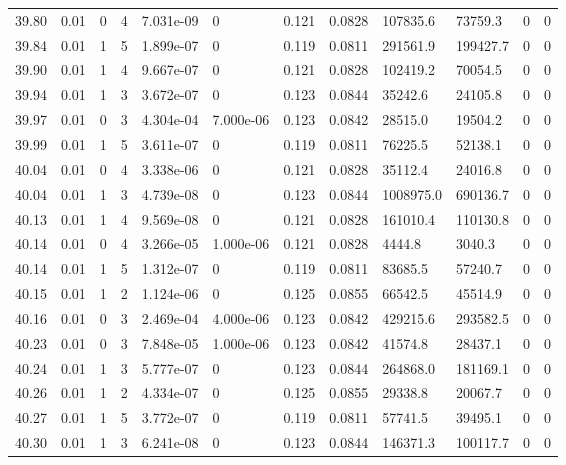 \documentclass[preview]{standalone}
\begin{document}
{{{{{{{{{{{\begin{tabular}{L{1.2cm}C{1.2cm} C{0.3cm}C{0.5cm} C{1.4cm}C{1.4cm} C{1.4cm}C{1.4cm} C{1.6cm}C{1.6cm} C{1.6cm}C{1.6cm}}
  39.80  &  0.01  & 0     &  4 &  7.031e-09  & 0  &  0.121&   0.0828& 107835.6 & 73759.3   &  0 & 0  \\ 
  39.84  &  0.01  & 1     &  5 &  1.899e-07  & 0  &  0.119&   0.0811& 291561.9 & 199427.7   &  0 & 0  \\ 
  39.90  &  0.01  & 1     &  4 &  9.667e-07  & 0  &  0.121&   0.0828& 102419.2 & 70054.5   &  0 & 0  \\ 
  39.94  &  0.01  & 1     &  3 &  3.672e-07  & 0  &  0.123&   0.0844& 35242.6 & 24105.8   &  0 & 0  \\ 
  39.97  &  0.01  & 0     &  3 &  4.304e-04  & 7.000e-06  &  0.123&   0.0842& 28515.0 & 19504.2   &  0 & 0  \\ 
  39.99  &  0.01  & 1     &  5 &  3.611e-07  & 0  &  0.119&   0.0811& 76225.5 & 52138.1   &  0 & 0  \\ 
  40.04  &  0.01  & 0     &  4 &  3.338e-06  & 0  &  0.121&   0.0828& 35112.4 & 24016.8   &  0 & 0  \\ 
  40.04  &  0.01  & 1     &  3 &  4.739e-08  & 0  &  0.123&   0.0844& 1008975.0 & 690136.7   &  0 & 0  \\ 
  40.13  &  0.01  & 1     &  4 &  9.569e-08  & 0  &  0.121&   0.0828& 161010.4 & 110130.8   &  0 & 0  \\ 
  40.14  &  0.01  & 0     &  4 &  3.266e-05  & 1.000e-06  &  0.121&   0.0828& 4444.8 & 3040.3   &  0 & 0  \\ 
  40.14  &  0.01  & 1     &  5 &  1.312e-07  & 0  &  0.119&   0.0811& 83685.5 & 57240.7   &  0 & 0  \\ 
  40.15  &  0.01  & 1     &  2 &  1.124e-06  & 0  &  0.125&   0.0855& 66542.5 & 45514.9   &  0 & 0  \\ 
  40.16  &  0.01  & 0     &  3 &  2.469e-04  & 4.000e-06  &  0.123&   0.0842& 429215.6 & 293582.5   &  0 & 0  \\ 
  40.23  &  0.01  & 0     &  3 &  7.848e-05  & 1.000e-06  &  0.123&   0.0842& 41574.8 & 28437.1   &  0 & 0  \\ 
  40.24  &  0.01  & 1     &  3 &  5.777e-07  & 0  &  0.123&   0.0844& 264868.0 & 181169.1   &  0 & 0  \\ 
  40.26  &  0.01  & 1     &  2 &  4.334e-07  & 0  &  0.125&   0.0855& 29338.8 & 20067.7   &  0 & 0  \\ 
  40.27  &  0.01  & 1     &  5 &  3.772e-07  & 0  &  0.119&   0.0811& 57741.5 & 39495.1   &  0 & 0  \\ 
  40.30  &  0.01  & 1     &  3 &  6.241e-08  & 0  &  0.123&   0.0844& 146371.3 & 100117.7   &  0 & 0  \\ 

\end{tabular}}}}}}}}}}}}
\end{document}

